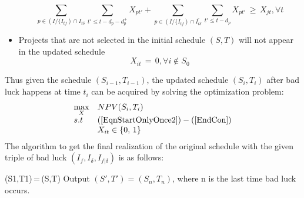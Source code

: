 \documentclass[final,3p,times]{elsarticle}
\begin{document}
\begin{itemize}
	\begin{equation}
		\sum\limits_{p \in (I/\{ I_{tf})\cap I_{t\delta}}\sum\limits_{t'\leq t-d_p-d^+_p} X_{pt'}+\sum\limits_{p \in (I/\{ I_{tf})\cap \bar{I_{t\delta}}}\sum\limits_{t'\leq t-d_p} X_{pt'}\,\geq\,X_{jt}, \forall t
	\end{equation}
	\item Projects that are not selected in the initial schedule $(S,T)$ will not appear in the updated schedule
	\begin{equation}\label{EndCon}
		X_{it}\,=\,0, \forall i \notin S_0 
	\end{equation}
	
\end{itemize}
Thus given the schedule $(S_{i-1},T_{i-1})$, the updated schedule $(S_i, T_i)$ after bad luck happens at time $t_i$ can be acquired by solving the optimization problem:
\begin{equation}\label{UpdateOpt}
	\begin{array}{ll}
		\max\limits_{X} &NPV(S_i,T_i)\\
		s.t &(\ref{EqnStartOnlyOnce2}) -(\ref{EndCon})\\
		& X_{it} \in \{0,\,1\}
	\end{array}
\end{equation}
The algorithm to get the final realization of the original schedule with the given triple of bad luck $(I_f, I_{\delta}, I_{f|\delta})$ is as follows:\\
\begin{algorithm}[H]
	(S1,T1)\,=\,(S,T)\;
	Output $(S',T')=(S_n,T_n)$, where n is the last time bad luck occurs.
\end{algorithm}
\end{document}
